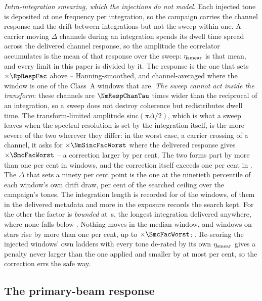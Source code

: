 \emph{Intra-integration smearing, which the injections do not model.} Each
injected tone is deposited at one frequency per integration, so the campaign
carries the channel response and the drift between integrations but not the
sweep within one. A carrier moving $\Delta$ channels during an integration
spends its dwell time spread across the delivered channel response, so the
amplitude the correlator accumulates is the mean of that response over the
sweep: $\eta_{\rm smear}$ is that mean, and every limit in this paper is
divided by it. The response is the one that sets $\times\RpRespFac$ above --
Hanning-smoothed, and channel-averaged where the window is one of the
\NmRespNAvgA{} Class~A windows that are. \emph{The sweep cannot act inside
the transform}: these channels are $\NmRespChanTau$ times wider than the
reciprocal of an integration, so a sweep does not destroy coherence but
redistributes dwell time. The transform-limited amplitude
$\mathrm{sinc}(\pi\Delta/2)$, which is what a sweep leaves when the spectral
resolution is set by the integration itself, is the more severe of the two
wherever they differ: in the worst case, a carrier crossing
\NmRespDeltaWorst{} of a channel, it asks for $\times\NmSincFacWorst$ where
the delivered response gives $\times\SmcFacWorst$ -- a correction larger by
\NmRespOverPct{} per cent. The two forms part by more than one per cent in \NmRespNPart{} windows,
and the correction itself exceeds one per cent in \NmRespNApplied.
The $\Delta$ that sets a ninety
per cent point is the one at the ninetieth percentile of each window's own
drift draw, \SmcQninePct{} per cent of the searched ceiling over the
campaign's \SmcNTone{} tones. The integration length is recorded for
\SmcNMeas{} of the \NWindows{} windows, \CsNDumpWin{} of them in the delivered
metadata and \SmNRecov{} more in the exposure records the search kept. For the
other \SmcNBound{} the factor is \emph{bounded} at \SmcDtCeil\,s, the longest
integration delivered anywhere, where none falls below \SmcBoundEta.
Nothing moves in the median window, and \SmcNAbove{} windows on
\SmcNAboveStar{} stars rise by more than one per cent, up to
$\times\SmcFacWorst$: \SmcAboveStars. Re-scoring the \SmcValNWin{} injected
windows' own ladders with every tone de-rated by its own $\eta_{\rm smear}$
gives a penalty never larger than the one applied and smaller by at most
\SmcValWorstPct{} per cent, so the correction errs the safe way.

\subsection{The primary-beam response}
\label{app:pbresp}

